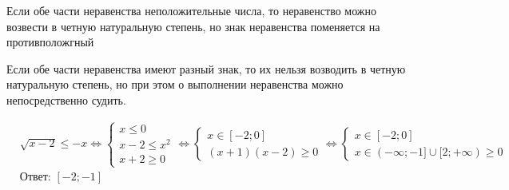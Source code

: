 \begin{remark}
    Если обе части неравенства неположительные числа, то неравенство можно возвести в четную натуральную степень, 
    но знак неравенства поменяется на противположгный
\end{remark}

\begin{remark}
    Если обе части неравенства имеют разный знак, то их нельзя возводить в четную натуральную степень, но при этом о выполнении неравенства
    можно непосредственно судить.
\end{remark}

\begin{example}
    \begin{align*}
        &\sqrt{x - 2} \le -x \iff
        \left\{\begin{array}{l}
            x \le 0 \\
            x - 2 \le x^2 \\
            x + 2 \ge 0
        \end{array}\right. \iff
        \left\{\begin{array}{l}
            x \in [-2; 0] \\
            (x + 1)(x - 2) \ge 0
        \end{array}\right. \iff
        \left\{\begin{array}{l}
            x \in [-2; 0] \\
            x \in (-\infty; -1] \cup [2; +\infty) \ge 0
        \end{array}\right. \\
        &\text{Ответ: } [-2; -1]
    \end{align*}
\end{example}

